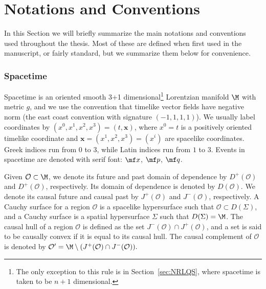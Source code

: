 



\section*{Notations and Conventions}

In this Section we will briefly summarize the main notations and conventions used throughout the thesis. Most of these are defined when first used in the manuscript, or fairly standard, but we summarize them below for convenience.


\subsubsection*{Spacetime}

Spacetime is an oriented smooth 3+1 dimensional\footnote{The only exception to this rule is in Section~\ref{sec:NRLQS}, where spacetime is taken to be $n+1$ dimensional.} Lorentzian manifold $\M$ with metric $g$, and we use the convention that timelike vector fields have negative norm (the east coast convention with signature $(-1,1,1,1)$). We usually label coordinates by $(x^0,x^1,x^2,x^3) = (t,\bm x)$, where $x^0 = t$ is a positively oriented timelike coordinate and $\bm x = (x^1,x^2,x^3) = (x^i)$ are spacelike coordinates. Greek indices run from $0$ to $3$, while Latin indices run from $1$ to $3$. Events in spacetime are denoted with serif font: $\mf x$, $\mf p$, $\mf q$. 

Given $\mathcal{O}\subset \M$, we denote its future and past domain of dependence by $D^{+}(\mathcal{O})$ and $D^{+}(\mathcal{O})$, respectively. Its domain of dependence is denoted by $D(\mathcal{O})$. We denote its causal future and causal past by $J^{+}(\mathcal{O})$ and $J^{-}(\mathcal{O})$, respectively. A Cauchy surface for a region $\mathcal{O}$ is a spacelike hypersurface such that $\mathcal{O}\subset D(\Sigma)$, and a Cauchy surface is a spatial hypersurface $\Sigma$ such that $D(\Sigma) = \M$. The causal hull of a region $\mathcal{O}$ is defined as the set $J^-(\mathcal{O})\cap J^+(\mathcal{O})$, and a set is said to be causally convex if it is equal to its causal hull. The causal complement of $\mathcal{O}$ is denoted by $\mathcal{O}' = \M\setminus (J^+(\mathcal{O})\cap J^-(\mathcal{O})).$



